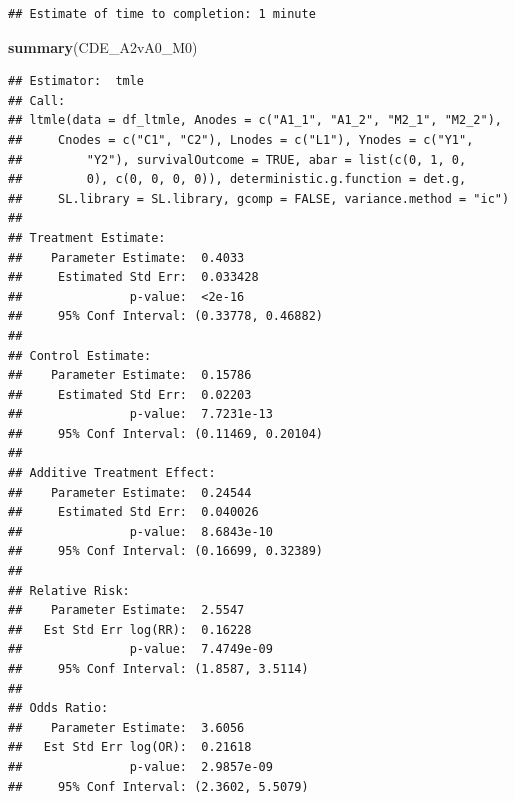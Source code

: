 \documentclass[
]{book}
\newenvironment{Shaded}{\begin{snugshade}}{\end{snugshade}}
\newcommand{\FunctionTok}[1]{\textcolor[rgb]{0.13,0.29,0.53}{\textbf{#1}}}
\newcommand{\NormalTok}[1]{#1}
\newcommand{\SpecialCharTok}[1]{\textcolor[rgb]{0.81,0.36,0.00}{\textbf{#1}}}
\begin{document}
\begin{verbatim}
## Estimate of time to completion: 1 minute
\end{verbatim}

\begin{Shaded}
\begin{Highlighting}[]
\FunctionTok{summary}\NormalTok{(CDE\_A2vA0\_M0)}
\end{Highlighting}
\end{Shaded}

\begin{verbatim}
## Estimator:  tmle 
## Call:
## ltmle(data = df_ltmle, Anodes = c("A1_1", "A1_2", "M2_1", "M2_2"), 
##     Cnodes = c("C1", "C2"), Lnodes = c("L1"), Ynodes = c("Y1", 
##         "Y2"), survivalOutcome = TRUE, abar = list(c(0, 1, 0, 
##         0), c(0, 0, 0, 0)), deterministic.g.function = det.g, 
##     SL.library = SL.library, gcomp = FALSE, variance.method = "ic")
## 
## Treatment Estimate:
##    Parameter Estimate:  0.4033 
##     Estimated Std Err:  0.033428 
##               p-value:  <2e-16 
##     95% Conf Interval: (0.33778, 0.46882) 
## 
## Control Estimate:
##    Parameter Estimate:  0.15786 
##     Estimated Std Err:  0.02203 
##               p-value:  7.7231e-13 
##     95% Conf Interval: (0.11469, 0.20104) 
## 
## Additive Treatment Effect:
##    Parameter Estimate:  0.24544 
##     Estimated Std Err:  0.040026 
##               p-value:  8.6843e-10 
##     95% Conf Interval: (0.16699, 0.32389) 
## 
## Relative Risk:
##    Parameter Estimate:  2.5547 
##   Est Std Err log(RR):  0.16228 
##               p-value:  7.4749e-09 
##     95% Conf Interval: (1.8587, 3.5114) 
## 
## Odds Ratio:
##    Parameter Estimate:  3.6056 
##   Est Std Err log(OR):  0.21618 
##               p-value:  2.9857e-09 
##     95% Conf Interval: (2.3602, 5.5079)
\end{verbatim}

\begin{Shaded}
\end{Shaded}
\end{document}
